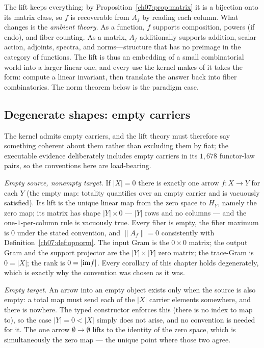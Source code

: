 \begin{remark}\label{ch07:rem:forget}
The lift keeps everything: by
Proposition~\ref{ch07:prop:matrix} it is a bijection onto its matrix class,
so $f$ is recoverable from $A_f$ by reading each column. What changes is the
\emph{ambient theory}. As a function, $f$ supports composition, powers (if
endo), and fiber counting. As a matrix, $A_f$ additionally supports addition,
scalar action, adjoints, spectra, and norms---structure that has no preimage
in the category of functions. The lift is thus an embedding of a small
combinatorial world into a larger linear one, and every use the kernel makes
of it takes the form: compute a linear invariant, then translate the answer
back into fiber combinatorics. The norm theorem below is the paradigm case.
\end{remark}

\subsection{Degenerate shapes: empty carriers}\label{ch07:sec:degenerate}

The kernel admits empty carriers, and the lift theory must therefore say
something coherent about them rather than excluding them by fiat; the
executable evidence deliberately includes empty carriers in its
$1{,}678$ functor-law pairs, so the conventions here are load-bearing.

\emph{Empty source, nonempty target.} If $|X|=0$ there is exactly one arrow
$f:X\to Y$ for each $Y$ (the empty map: totality quantifies over an empty
carrier and is vacuously satisfied). Its lift is the unique linear map from
the zero space to $H_Y$, namely the zero map; its matrix has shape
$|Y|\times 0$ --- $|Y|$ rows and no columns --- and the
one-$1$-per-column rule is vacuously true. Every fiber is empty, the fiber
maximum is $0$ under the stated convention, and
$\lVert A_f\rVert=0$ consistently with Definition~\ref{ch07:def:opnorm}.
The input Gram is the $0\times 0$ matrix; the output Gram and the support
projector are the $|Y|\times|Y|$ zero matrix; the trace-Gram is
$0=|X|$; the rank is $0=|\mathrm{im} f|$. Every corollary of this chapter holds
degenerately, which is exactly why the convention was chosen as it was.

\emph{Empty target.} An arrow into an empty object exists only when the
source is also empty: a total map must send each of the $|X|$ carrier
elements somewhere, and there is nowhere. The typed constructor enforces
this (there is no index to map to), so the case $|Y|=0<|X|$ simply does not
arise, and no convention is needed for it. The one arrow
$\emptyset\to\emptyset$ lifts to the identity of the zero space, which is
simultaneously the zero map --- the unique point where those two agree.


